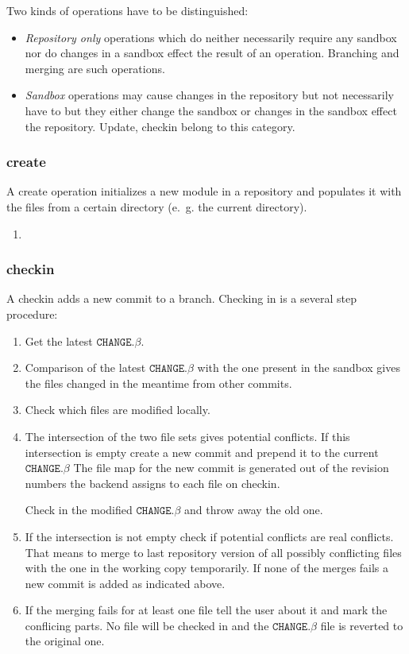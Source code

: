 \documentclass[fleqn, 10pt, a4paper]{article}
\begin{document}
Two kinds of operations have to be distinguished:
\begin{itemize}
\item \emph{Repository only} operations which do
neither necessarily require any sandbox nor do changes
in a sandbox effect the result of an operation.
Branching and merging are such operations.
\item \emph{Sandbox} operations may cause changes
in the repository but not necessarily have to but they
either change the sandbox or changes in the sandbox effect
the repository. Update, checkin belong to this category.
\end{itemize}


\subsubsection{create}

A create operation initializes a new module in a repository
and populates it with the files from a certain directory
(e.~g. the current directory).

\begin{enumerate}
\item 
\end{enumerate}

\subsubsection{checkin}

A checkin adds a new commit to a branch. Checking in is a
several step procedure:

\begin{enumerate}
\item Get the latest $\mathtt{CHANGE.}\beta$.
\item Comparison of the latest $\mathtt{CHANGE.}\beta$ with 
the one present in the sandbox gives the files changed
in the meantime from other commits.
\item Check which files are modified locally.
\item The intersection of the two file sets gives potential
conflicts. If this intersection is empty create a new commit
and prepend it to the current $\mathtt{CHANGE.}\beta$
The file map for the new commit is generated out of
the revision numbers the backend assigns to each file on
checkin.

Check in the modified $\mathtt{CHANGE.}\beta$ and throw
away the old one.
\item If the intersection is not empty check if potential
conflicts are real conflicts. That means to merge to last
repository version of all possibly conflicting files with 
the one in the working copy temporarily. If none of the merges
fails a new commit is added as indicated above.
\item If the merging fails for at least one file tell the user about
it and mark the conflicing parts. No file will be checked in and
the $\mathtt{CHANGE.}\beta$ file is reverted to the original one.
\end{enumerate}
\end{document}
